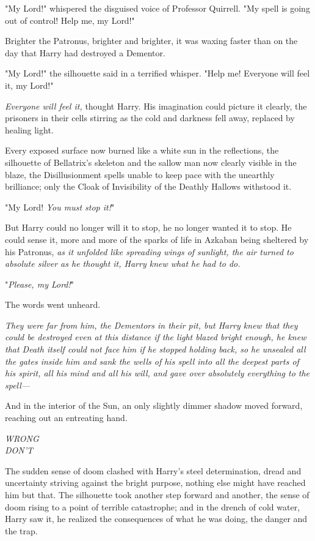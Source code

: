 "My Lord!" whispered the disguised voice of Professor Quirrell. "My spell is
going out of control! Help me, my Lord!"

Brighter the Patronus, brighter and brighter, it was waxing faster than on the
day that Harry had destroyed a Dementor.

"My Lord!" the silhouette said in a terrified whisper. "Help me! Everyone will
feel it, my Lord!"

\emph{Everyone will feel it,} thought Harry. His imagination could picture it
clearly, the prisoners in their cells stirring as the cold and darkness fell
away, replaced by healing light.

Every exposed surface now burned like a white sun in the reflections, the
silhouette of Bellatrix's skeleton and the sallow man now clearly visible in
the blaze, the Disillusionment spells unable to keep pace with the unearthly
brilliance; only the Cloak of Invisibility of the Deathly Hallows withstood
it.

"My Lord! \emph{You must stop it!}"

But Harry could no longer will it to stop, he no longer wanted it to stop. He
could sense it, more and more of the sparks of life in Azkaban being sheltered
by his Patronus, \emph{as it unfolded like spreading wings of sunlight, the air
turned to absolute silver as he thought it, Harry knew what he had to do.}

"\emph{Please, my Lord!}"

The words went unheard.

\emph{They were far from him, the Dementors in their pit, but Harry knew that
they could be destroyed even at this distance if the light blazed bright
enough, he knew that Death itself could not face him if he stopped holding
back, so he unsealed all the gates inside him and sank the wells of his spell
into all the deepest parts of his spirit, all his mind and all his will, and
gave over absolutely everything to the spell---}

And in the interior of the Sun, an only slightly dimmer shadow moved forward,
reaching out an entreating hand.

\emph{WRONG\\
DON'T}

The sudden sense of doom clashed with Harry's steel determination, dread and
uncertainty striving against the bright purpose, nothing else might have
reached him but that. The silhouette took another step forward and another, the
sense of doom rising to a point of terrible catastrophe; and in the drench of
cold water, Harry saw it, he realized the consequences of what he was doing,
the danger and the trap.

